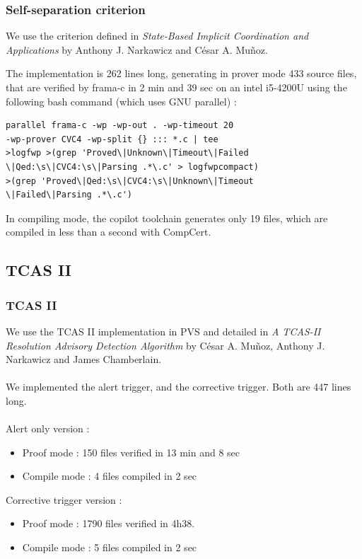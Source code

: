 \documentclass{beamer}
\begin{document}
\begin{frame}[fragile]
	\frametitle{Self-separation criterion}
	We use the criterion defined in \textit{State-Based Implicit Coordination
	and Applications} by Anthony J. Narkawicz and C\'esar A. Mu\~{n}oz.

	The implementation is 262 lines long, generating in prover mode 433 source files, that are verified by frama-c in 2 min and 39 sec on an intel i5-4200U using the following bash command (which uses GNU parallel) : 
\begin{lstlisting}
parallel frama-c -wp -wp-out . -wp-timeout 20 
-wp-prover CVC4 -wp-split {} ::: *.c | tee 
>logfwp >(grep 'Proved\|Unknown\|Timeout\|Failed
\|Qed:\s\|CVC4:\s\|Parsing .*\.c' > logfwpcompact) 
>(grep 'Proved\|Qed:\s\|CVC4:\s\|Unknown\|Timeout
\|Failed\|Parsing .*\.c')
\end{lstlisting}
	
	In compiling mode, the copilot toolchain generates only 19 files, which are compiled in less than a second with CompCert.
\end{frame}


\subsection{TCAS II}
\begin{frame}
	\tableofcontents[currentsubsection,sectionstyle=show/shaded,subsectionstyle=show/shaded/hide]
\end{frame}

\begin{frame}[fragile]
	\frametitle{TCAS II}
	We use the TCAS II implementation in PVS and detailed in \textit{A TCAS-II Resolution Advisory Detection Algorithm} by C\'esar A. Mu\~{n}oz, Anthony J. Narkawicz and James Chamberlain. \\~\\	
	We implemented the alert trigger, and the corrective trigger.
	Both are 447 lines long. \\~\\
	Alert only version :
\begin{itemize}
\item Proof mode : 150 files verified in 13 min and 8 sec
\item Compile mode : 4 files compiled in 2 sec
\end{itemize}
Corrective trigger version :
\begin{itemize}
\item Proof mode : 1790 files verified in 4h38.
\item Compile mode : 5 files compiled in 2 sec
\end{itemize}
	
\end{frame}
\end{document}
